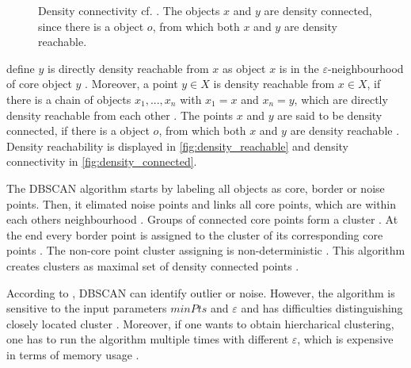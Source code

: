 \begin{figure}[htp] %
    \centering
    
    \caption{Density connectivity cf. \cite{OPTICS1999}.
    The objects $x$ and $y$ are density connected, since there is a object $o$, from which both $x$ and $y$ are density reachable.
    }
    \label{fig:density_connected}
\end{figure}



\citeauthor{OPTICS_kMeans_2016} define $y$ is directly density reachable from $x$ as object $x$ is in the $\varepsilon$-neighbourhood of core object $y$ \cite{OPTICS_kMeans_2016}.
Moreover, a point $y \in X$ is density reachable from $x \in X$, if there is a chain of objects $x_1, ..., x_n$ with $x_1 = x$ and $x_n = y$, 
which are directly density reachable from each other \cite{OPTICS_kMeans_2016}.
The points $x$ and $y$ are said to be density connected, if there is a object $o$, from which both $x$ and $y$ are density reachable \cite{OPTICS_kMeans_2016}.
Density reachability is displayed in \autoref{fig:density_reachable} and density connectivity in \autoref{fig:density_connected}.

The DBSCAN algorithm starts by labeling all objects as core, border or noise points.
Then, it elimated noise points and links all core points, which are within each others neighbourhood \cite{OPTICS_kMeans_2016}.
Groups of connected core points form a cluster \cite{OPTICS_kMeans_2016}.
At the end every border point is assigned to the cluster of its corresponding core points \cite{OPTICS_kMeans_2016}.
The non-core point cluster assigning is non-deterministic \cite{OPTICS2013}.
This algorithm creates clusters as maximal set of density connected points \cite{OPTICS_kMeans_2016}.

According to \citeauthor{OPTICS_kMeans_2016}, DBSCAN can identify outlier or noise.
However, the algorithm is sensitive to the input parameters $minPts$ and $\varepsilon$ and has difficulties distinguishing closely located cluster \cite{OPTICS_kMeans_2016}.
Moreover, if one wants to obtain hiercharical clustering, one has to run the algorithm multiple times with different $\varepsilon$, which is expensive in terms of memory usage \cite{OPTICS2013}.





